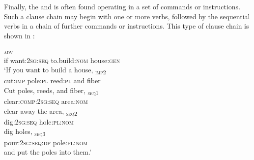  
 
Finally, the  and  is often found operating in a set of commands or instructions. Such a clause chain may begin with one or more  verbs, followed by the sequential verbs in a chain of further commands or instructions. This type of clause chain is shown in :



\ea\label{exa}
  \ea
  \textsc{\textsubscript{adv}} \\
if   want:\textsc{2sg:seq}   to.build:\textsc{nom}  house:\textsc{gen}    \\
  \glt ‘If you want to build a house, 
  \medskip
  \ex
  \textsc{\textsubscript{imp2}} \\
cut:\textsc{imp}   pole:\textsc{pl}   reed:\textsc{pl}    and   fiber    \\
  \glt Cut poles, reeds, and fiber,
  \medskip
  \ex
  \textsc{\textsubscript{seq1}} \\
clear:\textsc{comp:2sg:seq}   area:\textsc{nom}    \\
  \glt clear away the area,
  \medskip
  \ex
  \textsc{\textsubscript{seq2}} \\
dig:\textsc{2sg:seq}   hole:\textsc{pl:nom}    \\
  \glt dig holes,
  \medskip
  \ex
  \textsc{\textsubscript{seq3}} \\
pour:\textsc{2sg:seq:dp}   pole:\textsc{pl:nom}    \\
  \glt and put the poles into them.’
  \z  
\z 
\newpage  %
